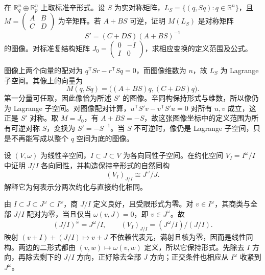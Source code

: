 \BookExercises
\begin{exercise}\label{g4:ex:0701:graph-action}
	在 \(\mathbb R^n_q\oplus\mathbb R^n_p\) 上取标准辛形式。设 \(S\) 为实对称矩阵，\(L_S=\{(q,Sq):q\in\mathbb R^n\}\)，且 \(M=\begin{pmatrix}A&B\\C&D\end{pmatrix}\) 为辛矩阵。若 \(A+BS\) 可逆，证明 \(M(L_S)\) 是对称矩阵
	\[
		S'=(C+DS)(A+BS)^{-1}
	\]
	的图像。对标准复结构矩阵 \(J_0=\begin{pmatrix}0&-I\\I&0\end{pmatrix}\)，求相应变换的定义范围及公式。
\end{exercise}
\begin{solution}
	图像上两个向量的配对为 \(q^{\mathsf T}Sr-r^{\mathsf T}Sq=0\)，而图像维数为 \(n\)，故 \(L_S\) 为 Lagrange 子空间。其像上的向量为
	\[
		M(q,Sq)=\bigl((A+BS)q,(C+DS)q\bigr).
	\]
	第一分量可任取，因此像恰为所述 \(S'\) 的图像。辛同构保持形式与维数，所以像仍为 Lagrange 子空间。对图像配对计算，\(u^{\mathsf T}S'v-v^{\mathsf T}S'u=0\) 对所有 \(u,v\) 成立，这正是 \(S'\) 对称。取 \(M=J_0\)，有 \(A+BS=-S\)，故这张图像坐标中的定义范围为所有可逆对称 \(S\)，变换为 \(S'=-S^{-1}\)。当 \(S\) 不可逆时，像仍是 Lagrange 子空间，只是不再能写成以整个 \(q\) 空间为底的图像。
\end{solution}

\begin{exercise}\label{g4:ex:0701:successive-reduction}
	设 \((V,\omega)\) 为线性辛空间，\(I\subset J\subset V\) 为各向同性子空间。在约化空间 \(V_I=I^\omega/I\) 中证明 \(J/I\) 各向同性，并构造保持辛形式的自然同构
	\[
		(V_I)_{J/I}\cong J^\omega/J.
	\]
	解释它为何表示分两次约化与直接约化相同。
\end{exercise}
\begin{solution}
	由 \(I\subset J\subset J^\omega\subset I^\omega\)，商 \(J/I\) 定义良好，且受限形式为零。对 \(v\in I^\omega\)，其商类与全部 \(J/I\) 配对为零，当且仅当 \(\omega(v,J)=0\)，即 \(v\in J^\omega\)。故
	\[
		(J/I)^{\overline\omega}=J^\omega/I,
		\qquad (V_I)_{J/I}=(J^\omega/I)/(J/I).
	\]
	映射 \((v+I)+(J/I)\mapsto v+J\) 不依赖代表元，满射且核为零，因而是线性同构。两边的二形式都由 \((v,w)\mapsto\omega(v,w)\) 定义，所以它保持形式。先除去 \(I\) 方向，再除去剩下的 \(J/I\) 方向，正好除去全部 \(J\) 方向；正交条件也相应从 \(I^\omega\) 收紧到 \(J^\omega\)。
\end{solution}

